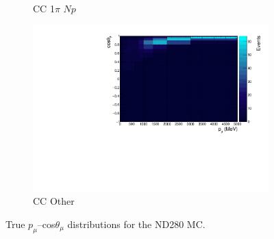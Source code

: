 \begin{figure}
\begin{subfigure}{.49\textwidth}
  \caption{CC 1$\pi$ $Np$}
\end{subfigure}
\begin{subfigure}{.49\textwidth}
  \centering
  \includegraphics[width=0.9\linewidth]{figs/nd280_pmtmuu_ccOther.pdf}
  \caption{CC Other}
\end{subfigure}
\caption{True $p_{\mu}$--cos$\theta_{\mu}$ distributions for the ND280 MC.}
\label{fig:nd280PmuTmu}
\end{figure}

